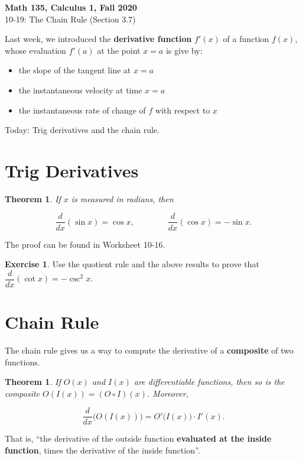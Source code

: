 \documentclass[11pt,reqno,final]{amsart}
\numberwithin{figure}{section}
\newtheorem{theorem}[equation]{Theorem}%
\theoremstyle{definition} %
\newtheorem{exercise}[question]{Exercise}
\begin{document}
\begin{center}
        \textbf{\Large Math 135, Calculus 1, Fall 2020}\\[10pt]
        {\large 10-19: The Chain Rule (Section 3.7)}
\end{center}

\thispagestyle{empty}


\renewcommand{\thesection}{\Alph{section}}


Last week, we introduced the \textbf{derivative function} $f'(x)$ of a function $f(x)$, whose evaluation $f'(a)$ at the point $x=a$ is give by:
\begin{itemize}
\item the slope of the tangent line at $x=a$
\item the instantaneous velocity at time $x = a$
\item the instantaneous rate of change of $f$ with respect to $x$
\end{itemize}

Today: Trig derivatives and the chain rule.

\section{Trig Derivatives}

\begin{theorem}
        If $x$ is measured in radians, then
        \begin{framed}
                \[
                        \dfrac{d}{dx}(\sin x) = \cos x,
                        \qquad \qquad
                        \dfrac{d}{dx}(\cos x) = -\sin x.
                        \]
        \end{framed}
\end{theorem}

The proof can be found in Worksheet 10-16.

\begin{exercise}
        Use the quotient rule and the above results to prove that $\dfrac{d}{dx}(\cot x) = -\csc^2 x$.
        \vfill
\end{exercise}

\newpage

\section{Chain Rule}

The chain rule gives us a way to compute the derivative of a \textbf{composite} of two functions.
\begin{theorem}
        If $O(x)$ and $I(x)$ are differentiable functions, then so is the composite $O(I(x)) = (O \circ I)(x)$.
        Moreover,
        \begin{framed}
                \[
                        \dfrac{d}{dx}\Big( O(I(x)) \Big) = O'\big( I(x) \big) \cdot I'(x).
                \]
        \end{framed}
\end{theorem}
That is, ``the derivative of the outside function \textbf{evaluated at the inside function}, times the derivative of the inside function''.
\end{document}
